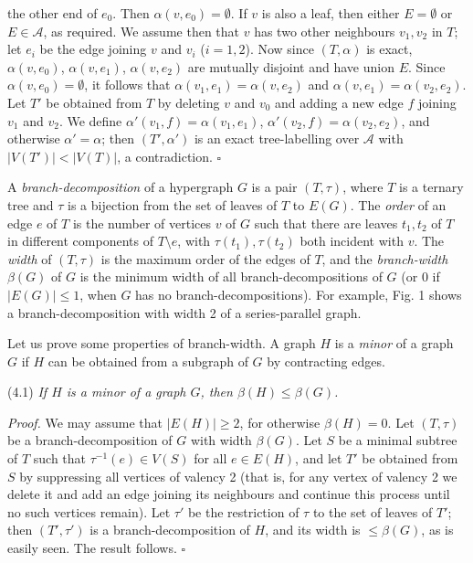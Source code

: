 \noindent the other end of $e_0$. Then $\alpha(v, e_0) = \emptyset$. If $v$ is also a leaf, then either $E = \emptyset$ or $E \in \mathscr{A}$, as required. We assume then that $v$ has two other neighbours $v_1, v_2$ in $T$; let $e_i$ be the edge joining $v$ and $v_i$ ($i = 1, 2$). Now since $(T, \alpha)$ is exact, $\alpha(v, e_0)$, $\alpha(v, e_1)$, $\alpha(v, e_2)$ are mutually disjoint and have union $E$. Since $\alpha(v, e_0) = \emptyset$, it follows that $\alpha(v_1, e_1) = \alpha(v, e_2)$ and $\alpha(v, e_1) = \alpha(v_2, e_2)$. Let $T'$ be obtained from $T$ by deleting $v$ and $v_0$ and adding a new edge $f$ joining $v_1$ and $v_2$. We define $\alpha'(v_1, f) = \alpha(v_1, e_1)$, $\alpha'(v_2, f) = \alpha(v_2, e_2)$, and otherwise $\alpha' = \alpha$; then $(T', \alpha')$ is an exact tree-labelling over $\mathscr{A}$ with $|V(T')| < |V(T)|$, a contradiction. $\square$


A \textit{branch-decomposition} of a hypergraph $G$ is a pair $(T, \tau)$, where $T$ is a ternary tree and $\tau$ is a bijection from the set of leaves of $T$ to $E(G)$. The \textit{order} of an edge $e$ of $T$ is the number of vertices $v$ of $G$ such that there are leaves $t_1, t_2$ of $T$ in different components of $T \setminus e$, with $\tau(t_1), \tau(t_2)$ both incident with $v$. The \textit{width} of $(T, \tau)$ is the maximum order of the edges of $T$, and the \textit{branch-width} $\beta(G)$ of $G$ is the minimum width of all branch-decompositions of $G$ (or 0 if $|E(G)| \le 1$, when $G$ has no branch-decompositions). For example, Fig. 1 shows a branch-decomposition with width 2 of a series-parallel graph.

Let us prove some properties of branch-width. A graph $H$ is a \textit{minor} of a graph $G$ if $H$ can be obtained from a subgraph of $G$ by contracting edges.

\stmt
(4.1) \textit{If $H$ is a minor of a graph $G$, then $\beta(H) \le \beta(G)$.}

\textit{Proof.} We may assume that $|E(H)| \ge 2$, for otherwise $\beta(H) = 0$. Let $(T, \tau)$ be a branch-decomposition of $G$ with width $\beta(G)$. Let $S$ be a minimal subtree of $T$ such that $\tau^{-1}(e) \in V(S)$ for all $e \in E(H)$, and let $T'$ be obtained from $S$ by suppressing all vertices of valency 2 (that is, for any vertex of valency 2 we delete it and add an edge joining its neighbours and continue this process until no such vertices remain). Let $\tau'$ be the restriction of $\tau$ to the set of leaves of $T'$; then $(T', \tau')$ is a branch-decomposition of $H$, and its width is $\le \beta(G)$, as is easily seen. The result follows. $\square$

